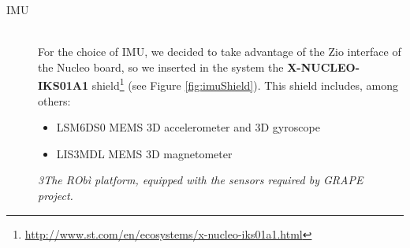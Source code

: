 \begin{description}
	\item[IMU] \hfill \\ For the choice of \ac{IMU}, we decided to take advantage of the Zio interface of the Nucleo board, so we inserted in the system the \textbf{X-NUCLEO-IKS01A1} shield\footnote{\url{http://www.st.com/en/ecosystems/x-nucleo-iks01a1.html}}
	(see Figure \ref{fig:imuShield}).
	This shield includes, among others:
	\begin{itemize}
		\item LSM6DS0 MEMS 3D accelerometer and 3D gyroscope
		\item LIS3MDL MEMS 3D magnetometer
	\end{itemize}
\end{description}



\begin{figure}
	\centering
	\qquad
	\caption{\textit{3The RObì platform, equipped with the sensors required by \ac{GRAPE} project.}}
	\label{fig:robiGrape}
\end{figure}

